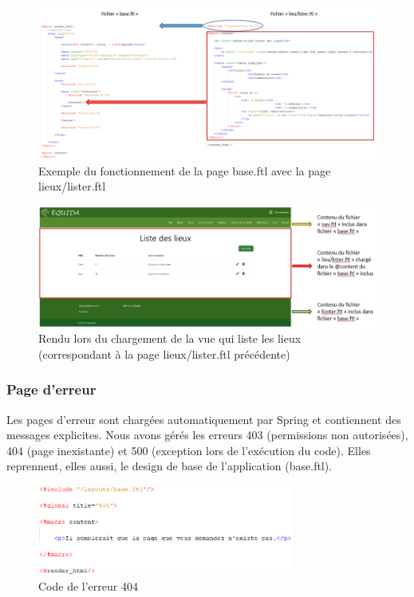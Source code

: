 				\begin{figure}[H]
					\centering\includegraphics[width=1\textwidth, keepaspectratio]{res/fonctionnementBaseFtl.png}
					\caption{Exemple du fonctionnement de la page base.ftl avec la page lieux/lister.ftl}
				\end{figure}

				\begin{figure}[H]
					\centering\includegraphics[width=1\textwidth, keepaspectratio]{res/exempleFonctionnementBaseLieuFtl.png}
					\caption{Rendu lors du chargement de la vue qui liste les lieux (correspondant à la page lieux/lister.ftl précédente)}
				\end{figure}

			\subsubsection{Page d'erreur}

				Les pages d'erreur sont chargées automatiquement par Spring et contiennent des messages explicites. Nous avons gérés les erreurs 403 (permissions non autorisées), 404 (page inexistante) et 500 (exception lors de l'exécution du code). Elles reprennent, elles aussi, le design de base de l'application (base.ftl).

				\begin{figure}[H]
					\centering\includegraphics[width=0.75\textwidth, keepaspectratio]{res/codeErreur404.png}
					\caption{Code de l'erreur 404}
				\end{figure}

